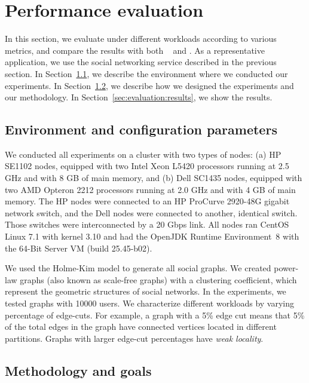\section{Performance evaluation}
\label{sec:experiments}

In this section, we evaluate \dynastar{} under different workloads
according to various metrics, and compare the results with both
\ssmr{}~\cite{bezerra2014ssmr} and \dssmr. As a representative
application, we use the \appname{} social networking service described in the
previous section. In Section~\ref{sec:evaluation:setup}, we
describe the environment where we conducted our experiments.  In
Section~\ref{sec:evaluation:methodology}, we describe how we designed
the experiments and our methodology.  In
Section~\ref{sec:evaluation:results}, we show the results.

\subsection{Environment and configuration parameters}
\label{sec:evaluation:setup}

We conducted all experiments on a cluster with two types of nodes: (a)
HP SE1102 nodes, equipped with two Intel Xeon L5420 processors running
at 2.5 GHz and with 8 GB of main memory, and (b) Dell SC1435 nodes,
equipped with two AMD Opteron 2212 processors running at 2.0 GHz and
with 4 GB of main memory. The HP nodes were connected to an HP
ProCurve 2920-48G gigabit network switch, and the Dell nodes were
connected to another, identical switch. Those switches were
interconnected by a 20 Gbps link.  All nodes ran CentOS Linux 7.1 with
kernel 3.10 and had the OpenJDK Runtime Environment~8 with the
\mbox{64-Bit} Server VM (build 25.45-b02).

We used the Holme-Kim model \cite{holme-kim} to generate all social
graphs.  We created power-law graphs (also known as scale-free graphs)
with a clustering coefficient, which represent the geometric
structures of social networks.  In the experiments, we tested graphs
with 10000 users. We characterize different workloads by varying percentage of edge-cuts.
For example, a graph with a 5\% edge cut means that 5\% of the total edges
in the graph have connected vertices located in different partitions.
Graphs with larger edge-cut percentages have \emph{weak locality}.

\subsection{Methodology and goals}
\label{sec:evaluation:methodology}

